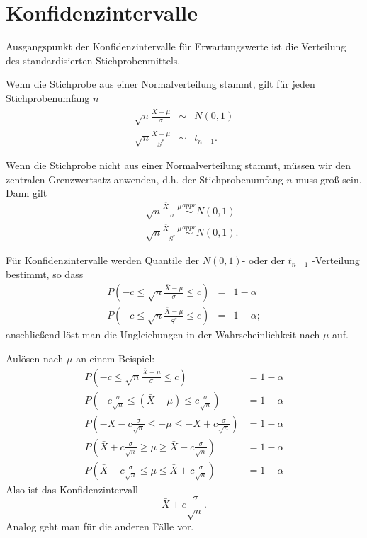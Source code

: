 \documentclass{article}
\begin{document}
\section*{Konfidenzintervalle}
Ausgangspunkt der Konfidenzintervalle f\"{u}r Erwartungswerte 
ist die Verteilung des standardisierten Stichprobenmittels.

Wenn die Stichprobe aus einer Normalverteilung stammt, gilt f\"{u}r jeden
Stichprobenumfang $n$%
\begin{eqnarray*}
\sqrt{n}\frac{\bar{X}-\mu }{\sigma } &\sim &N(0,1) \\
\sqrt{n}\frac{\bar{X}-\mu }{S^{\ast }} &\sim &t_{n-1}.
\end{eqnarray*}

Wenn die Stichprobe nicht aus einer Normalverteilung stammt, m\"{u}ssen wir
den zentralen Grenzwertsatz anwenden, d.h. der Stichprobenumfang $n$ muss groß sein. 
Dann gilt%
\begin{eqnarray*}
&&\sqrt{n}\frac{\bar{X}-\mu }{\sigma }\overset{appr}{\sim }N(0,1) \\
&&\sqrt{n}\frac{\bar{X}-\mu }{S^{\ast }}\overset{appr}{\sim }N(0,1).
\end{eqnarray*}

F\"{u}r Konfidenzintervalle werden Quantile der $N(0,1)$- oder der $t_{n-1}$%
-Verteilung bestimmt, so dass%
\begin{eqnarray*}
P\left( -c\leq \sqrt{n}\frac{\bar{X}-\mu }{\sigma }\leq c\right) 
&=&1-\alpha  \\
P\left( -c\leq \sqrt{n}\frac{\bar{X}-\mu }{S^{\ast }}\leq c\right) 
&=&1-\alpha ;
\end{eqnarray*}%
anschlie\ss end l\"{o}st man die Ungleichungen in der Wahrscheinlichkeit
nach $\mu $ auf.

Aulösen nach $\mu$ an einem Beispiel:
\begin{align*}
P\left( -c\leq \sqrt{n}\frac{\bar{X}-\mu }{\sigma }\leq c\right) &= 1-\alpha \\
P\left( -c\frac{\sigma}{\sqrt{n}}\leq (\bar{X}-\mu)\leq c\frac{\sigma}{\sqrt{n}}\right) &= 1-\alpha \\
P\left( -\bar X-c\frac{\sigma}{\sqrt{n}}\leq -\mu \leq -\bar X+c\frac{\sigma}{\sqrt{n}}\right) &= 1-\alpha \\
P\left( \bar X+c\frac{\sigma}{\sqrt{n}}\geq \mu \geq \bar X-c\frac{\sigma}{\sqrt{n}}\right) &= 1-\alpha \\
P\left( \bar X-c\frac{\sigma}{\sqrt{n}}\leq \mu \leq \bar X+c\frac{\sigma}{\sqrt{n}}\right) &= 1-\alpha 
\end{align*}
Also ist das Konfidenzintervall
\[
\bar X\pm c\frac{\sigma}{\sqrt{n}}.
\]
Analog geht man für die anderen Fälle vor.
\end{document}
